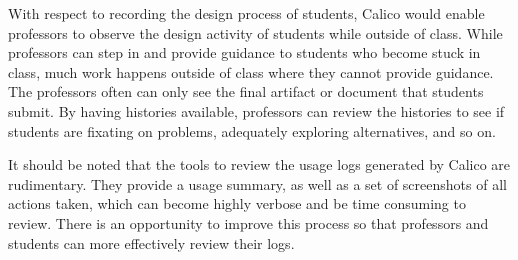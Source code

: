 With respect to recording the design process of students, Calico would enable professors to observe the design activity of students while outside of class. While professors can step in and provide guidance to students who become stuck in class, much work happens outside of class where they cannot provide guidance. The professors often can only see the final artifact or document that students submit. By having histories available, professors can review the histories to see if students are fixating on problems, adequately exploring alternatives, and so on.

It should be noted that the tools to review the usage logs generated by Calico are rudimentary. They provide a usage summary, as well as a set of screenshots of all actions taken, which can become highly verbose and be time consuming to review. There is an opportunity to improve this process so that professors and students can more effectively review their logs.

